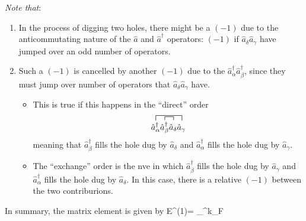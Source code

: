 \documentclass[12pt]{article}
\begin{document}
\emph{Note that}:
\begin{enumerate}
\item In the process of digging two holes, there might
be a $(-1)$ due to the anticommutating nature
of the $\hat{a}$ and $\hat{a}^{\dagger}$ operators:
\be
{}
\ee
$(-1)$ if $\hat{a}_{\delta} \hat{a}_{\gamma}$ have jumped over an
odd number of operators.
%
\item Such a $(-1)$ is cancelled by another $(-1)$
due to the $\hat{a}_{\alpha}^{\dagger} \hat{a}_{\beta}^{\dagger}$, since they must jump
over number of operators that $\hat{a}_{\delta} \hat{a}_{\gamma}$ have.
\begin{itemize}
\item This is true if this happens in the
``direct'' order
\[
\contraction[1.5ex]{}%
{\hat{a}_{\alpha}^{\dagger}}%
{\hat{a}_{\beta}^{\dagger}\hat{a}_{\delta}}%
{\hat{a}_{\gamma}}%
\contraction%
{\hat{a}_{\alpha}^{\dagger}}%
{\hat{a}_{\beta}^{\dagger}}{}{\hat{a}_{\delta}}%
{\hat{a}_{\alpha}^{\dagger}}%
{\hat{a}_{\beta}^{\dagger}\hat{a}_{\delta}}%
{\hat{a}_{\gamma}}
\]
meaning that
$\hat{a}^\dagger_{\beta}$ fills the hole dug by $\hat{a}_{\delta}$ and
$\hat{a}^\dagger_{\alpha}$ fills the hole dug by $\hat{a}_{\gamma}$.
\item The ``exchange'' order is the nve in which
$\hat{a}^\dagger_{\beta}$ fills the hole dug by $\hat{a}_{\gamma}$ and
$\hat{a}^\dagger_{\alpha}$ fills the hole dug by $\hat{a}_{\delta}$.
In this case, there is a relative
$(-1)$ between the two contriburions.
\end{itemize}
\end{enumerate}
In summary, the matrix element is given by
\be
E^{(1)}= \sum_{\alpha \beta}^{k_{F}}
\ee
\end{document}
